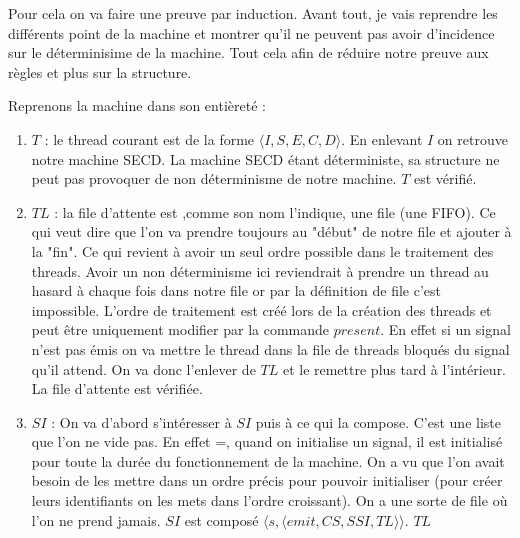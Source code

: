 \documentclass[10pt,a4paper]{report}
\begin{document}
	Pour cela on va faire une preuve par induction. Avant tout, je vais reprendre les différents point de la machine et montrer qu'il ne peuvent pas avoir d'incidence sur le déterminisime de la machine. Tout cela afin de réduire notre preuve aux règles et plus sur la structure.
	\bigbreak
	
	Reprenons la machine dans son entièreté : 
	\begin{enumerate}
		\item $T$ : le thread courant est de la forme $\langle I,S,E,C,D \rangle$. En enlevant $I$ on retrouve notre machine SECD. La machine SECD étant déterministe, sa structure ne peut pas provoquer de non déterminisme de notre machine. $T$ est vérifié.
		
		\item $TL$ : la file d'attente est ,comme son nom l'indique, une file (une FIFO). Ce qui veut dire que l'on va prendre toujours au "début" de notre file et ajouter à la "fin". Ce qui revient à avoir un seul ordre possible dans le traitement des threads. Avoir un non déterminisme ici reviendrait à prendre un thread au hasard à chaque fois dans notre file or par la définition de file c'est impossible. L'ordre de traitement est créé lors de la création des threads et peut être uniquement modifier par la commande $present$. En effet si un signal n'est pas émis on va mettre le thread dans la file de threads bloqués du signal qu'il attend. On va donc l'enlever de $TL$ et le remettre plus tard à l'intérieur. La file d'attente est vérifiée.
		
		\item $SI$ : On va d'abord s'intéresser à $SI$ puis à ce qui la compose. C'est une liste que l'on ne vide pas. En effet =, quand on initialise un signal, il est initialisé pour toute la durée  du fonctionnement de la machine. On a vu que l'on avait besoin de les mettre dans un ordre précis pour pouvoir initialiser (pour créer leurs identifiants on les mets dans l'ordre croissant). On a une sorte de file où l'on ne prend jamais. $SI$ est composé $\langle s,\langle emit,CS,SSI,TL\rangle\rangle$. $TL$ 
	\end{enumerate}
	\bigbreak
	
\end{document}
